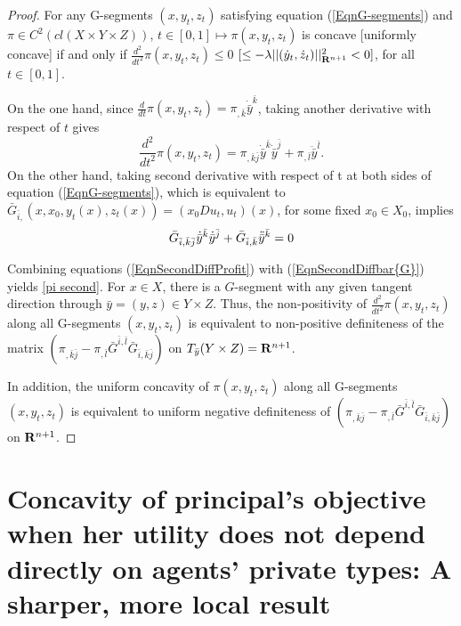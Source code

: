 \begin{proof}%
	For any G-segments $(x, y_t, z_t)$ satisfying equation (\ref{EqnG-segments}) and $\pi \in C^2(cl(X\times Y \times Z)
	)$,
	$t\in[0,1] \longmapsto \pi(x, y_t ,z_t)$ is concave [uniformly concave] if and only if $\frac{d^2}{dt^2} \pi(x, y_t, z_t)\le  0$ $[\le -\lambda ||(\dot{y}_t,\dot{z}_t)||^2_{{\mathbf R}^{n+1}}<0]$, for all $t \in [0,1]$.
	
	On the one hand, since $\frac{d}{dt}\pi(x, y_t, z_t) = \pi_{,\bar{k}} \dot{\bar y}^{\bar{k}}$, taking another derivative with respect of $t$ gives 
	\begin{equation}\label{EqnSecondDiffProfit}
	\frac{d^2}{dt^2} \pi(x, y_t, z_t) = 
	\pi_{,\bar{k}\bar{j}}\dot{\bar y}^{\bar{k}} \dot{\bar y}^{\bar{j}}+ \pi_{,\bar{l}}\ddot {\bar y}^{\bar{l}}.
	\end{equation}
	On the other hand, taking second derivative with respect of t at both sides of equation (\ref{EqnG-segments}), which is equivalent to $\bar{G}_{\bar{i},}(x, x_0, y_t(x), z_t(x)) = (x_0Du_t, u_t)(x)$, for some fixed $x_0\in X_0$, implies
	\begin{equation}\label{EqnSecondDiffbar{G}}
	\bar{G}_{\bar{i},\bar{k}\bar{j}}\dot{\bar y}^{\bar{k}} \dot {\bar y}^{\bar{j}}+\bar{G}_{\bar{i},\bar{k}} \ddot{\bar y}^{\bar{k}} =0 
	\end{equation}
	
	Combining equations (\ref{EqnSecondDiffProfit}) with (\ref{EqnSecondDiffbar{G}}) yields
	\eqref{pi second}.
	For $x \in X$, there is a $G$-segment with any given tangent direction through $\bar y = (y,z) \in Y \times Z$.
	Thus, the non-positivity  of $\frac{d^2}{dt^2} \pi(x, y_t, z_t)$ along all G-segments $(x, y_t, z_t)$ is equivalent to non-positive  definiteness of the matrix $(\pi_{,\bar{k}\bar{j}}- \pi_{,\bar{l}} \bar{G}^{\bar i,\bar l}\bar{G}_{\bar{i},\bar{k}\bar{j}})$ on $T_{\bar y} (Y\times Z)={\mathbf R}^{n+1}$.
	
	In addition, the uniform concavity of $\pi(x, y_t, z_t)$ along all G-segments $(x, y_t, z_t)$ is equivalent to uniform negative definiteness of $(\pi_{,\bar{k}\bar{j}}- \pi_{,\bar{l}} \bar{G}^{\bar i,\bar l}\bar{G}_{\bar{i},\bar{k}\bar{j}})$ on ${\mathbf R}^{n+1}$.
\end{proof}\medskip









\section{Concavity of principal's objective when her utility does not depend directly on agents' private types:  
	A sharper, more local result} 
\label{section:privateInformation}


